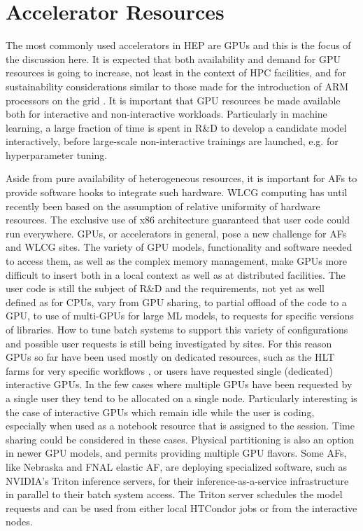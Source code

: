 \section{Accelerator  Resources}
\label{accelerators}

The most commonly used accelerators in HEP are GPUs and this is the focus of the discussion here. It is expected that both availability and demand for GPU resources is going to increase, not least in the context of HPC facilities, and for sustainability considerations similar to those made for the introduction of ARM processors on the grid \cite{arm}. It is important that GPU resources be made available both for interactive and non-interactive workloads. Particularly in machine learning, a large fraction of time is spent in R\&D to develop a candidate model interactively, before large-scale non-interactive trainings are launched, e.g. for hyperparameter tuning. 

Aside from pure availability of heterogeneous resources, it is important for AFs to provide software hooks to integrate such hardware. WLCG computing has until recently been based on the assumption of relative uniformity of hardware resources. The exclusive use of x86 architecture guaranteed that user code could run everywhere. GPUs, or accelerators in general, pose a new challenge for AFs and WLCG sites. The variety of GPU models, functionality and software needed to access them, as well as the complex memory management, make GPUs more difficult to insert both in a local context as well as at distributed facilities. The user code is still the subject of R\&D and the requirements, not yet as well defined as for CPUs, vary from GPU sharing, to partial offload of the code to a GPU,  to use of multi-GPUs for large ML models, to requests for specific versions of libraries. How to tune batch systems to support this variety of configurations and possible user requests is still being investigated by sites. For this reason GPUs so far have been used mostly on dedicated resources, such as the HLT farms for very specific workflows \cite{lhcbhltgpu}, or users have requested single (dedicated) interactive GPUs. In the few cases where multiple GPUs have been requested by a single user they tend to be allocated on a single node. Particularly interesting is the case of interactive GPUs which remain idle while the user is coding, especially when used as a notebook resource that is assigned to the session. Time sharing could be considered in these cases. Physical partitioning is also an option in newer GPU models, and permits providing multiple GPU flavors. Some AFs, like Nebraska and FNAL elastic AF, are deploying specialized software, such as NVIDIA's Triton inference servers, for their inference-as-a-service infrastructure in parallel to their batch system access. The Triton server schedules the model requests and can be used from either local HTCondor jobs or from the interactive nodes.

